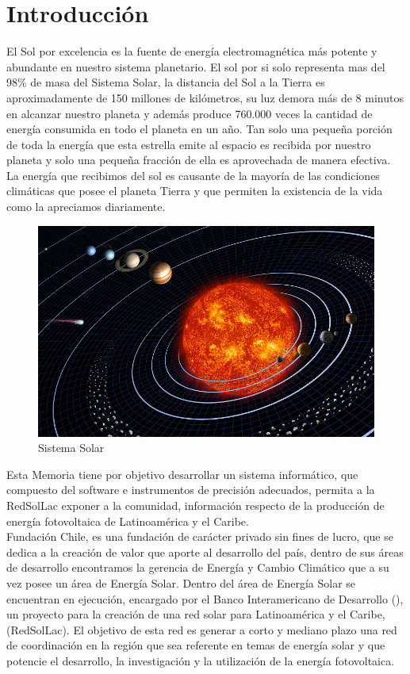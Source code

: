 \chapter{Introducción}
\label{ch:introduccion}

El Sol por excelencia es la fuente de energía electromagnética más potente y abundante en nuestro sistema planetario. El sol por si solo representa mas del 98\% de masa del Sistema Solar, la distancia del Sol a la Tierra es aproximadamente de 150 millones de kilómetros, su luz demora más de 8 minutos en alcanzar nuestro planeta y además produce 760.000 veces la cantidad de energía consumida en todo el planeta en un año. Tan solo una pequeña porción de toda la energía que esta estrella emite al espacio es recibida por nuestro planeta y solo una pequeña fracción de ella es aprovechada de manera efectiva. La energía que recibimos del sol es causante de la mayoría de las condiciones climáticas que posee el planeta Tierra y que permiten la existencia de la vida como la apreciamos diariamente.\\

\begin{figure}[h!]
        \centering
        \includegraphics[scale=0.35]{images/solarSis}
        \caption{Sistema Solar}
\end{figure}

Esta Memoria tiene por objetivo desarrollar un sistema informático, que compuesto del software e instrumentos de precisión adecuados, permita a la RedSolLac exponer a la comunidad, información respecto de la producción de energía fotovoltaica de Latinoamérica y el Caribe.\\ 
	
Fundación Chile, es una fundación de carácter privado sin fines de lucro, que se dedica a la creación de valor que aporte al desarrollo del país, dentro de sus áreas de desarrollo encontramos la gerencia de Energía y Cambio Climático que a su vez posee un área de Energía Solar. Dentro del área de Energía Solar se encuentran en ejecución, encargado por el Banco Interamericano de Desarrollo (), un proyecto para la creación de una red solar para Latinoamérica y el Caribe, (RedSolLac\cite{redSolLac:1}). El objetivo de esta red es generar a corto y mediano plazo una red de coordinación en la región que sea referente en temas de energía solar y que potencie el desarrollo, la investigación y la utilización de la energía fotovoltaica.\\
 

